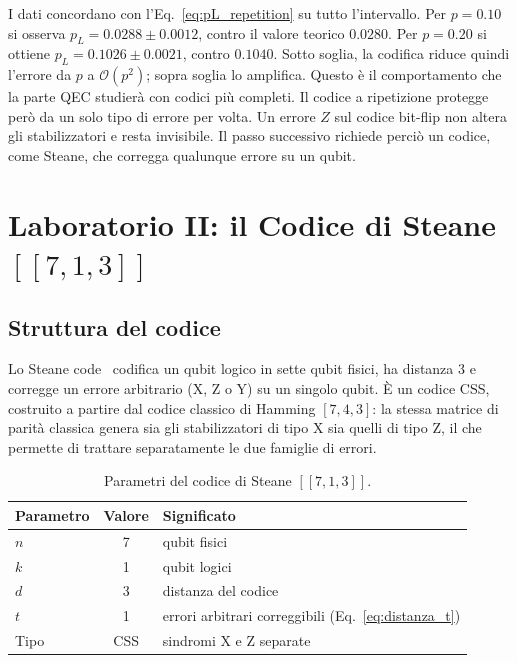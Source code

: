 \begin{onehalfspace}
I dati concordano con l'Eq.~\ref{eq:pL_repetition} su tutto l'intervallo. Per $p = 0.10$ si osserva $p_L = 0.0288 \pm 0.0012$, contro il valore teorico $0.0280$. Per $p = 0.20$ si ottiene $p_L = 0.1026 \pm 0.0021$, contro $0.1040$. Sotto soglia, la codifica riduce quindi l'errore da $p$ a $\mathcal{O}(p^2)$; sopra soglia lo amplifica. Questo è il comportamento che la parte \ac{QEC} studierà con codici più completi. Il codice a ripetizione protegge però da un solo tipo di errore per volta. Un errore $Z$ sul codice bit-flip non altera gli stabilizzatori e resta invisibile. Il passo successivo richiede perciò un codice, come Steane, che corregga qualunque errore su un qubit.

\section{Laboratorio II: il Codice di Steane $[[7,1,3]]$}
\label{sec:steane}

\subsection{Struttura del codice}

Lo Steane code~\cite{steane1996} codifica un qubit logico in sette qubit fisici, ha distanza 3 e corregge un errore arbitrario (X, Z o Y) su un singolo qubit. È un codice \ac{CSS}, costruito a partire dal codice classico di Hamming $[7,4,3]$: la stessa matrice di parità classica genera sia gli stabilizzatori di tipo X sia quelli di tipo Z, il che permette di trattare separatamente le due famiglie di errori.

\begin{table}[H]
\centering
\begin{tabular}{lcl}
\toprule
\textbf{Parametro} & \textbf{Valore} & \textbf{Significato} \\
\midrule
$n$ & 7 & qubit fisici \\
$k$ & 1 & qubit logici \\
$d$ & 3 & distanza del codice \\
$t$ & 1 & errori arbitrari correggibili (Eq.~\ref{eq:distanza_t}) \\
Tipo & \ac{CSS} & sindromi X e Z separate \\
\bottomrule
\end{tabular}
\caption[Parametri del codice di Steane]{Parametri del codice di Steane $[[7,1,3]]$.}
\label{tab:steane_parametri}
\end{table}


\end{onehalfspace}
